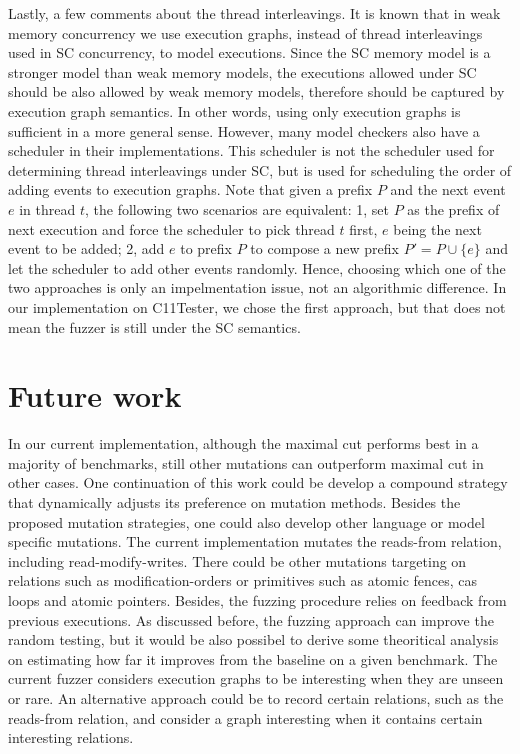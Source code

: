 Lastly, a few comments about the thread interleavings. It is known that in weak memory concurrency we use execution graphs, instead of thread interleavings used in SC concurrency, to model executions. Since the SC memory model is a stronger model than weak memory models, the executions allowed under SC should be also allowed by weak memory models, therefore should be captured by execution graph semantics. In other words, using only execution graphs is sufficient in a more general sense. However, many model checkers also have a scheduler in their implementations. This scheduler is not the scheduler used for determining thread interleavings under SC, but is used for scheduling the order of adding events to execution graphs. Note that given a prefix $P$ and the next event $e$ in thread $t$, the following two scenarios are equivalent: 1, set $P$ as the prefix of next execution and force the scheduler to pick thread $t$ first, $e$ being the next event to be added; 2, add $e$ to prefix $P$ to compose a new prefix $P' = P \cup \{e\}$ and let the scheduler to add other events randomly. Hence, choosing which one of the two approaches is only an impelmentation issue, not an algorithmic difference. In our implementation on C11Tester, we chose the first approach, but that does not mean the fuzzer is still under the SC semantics.


\section{Future work}

In our current implementation, although the maximal cut performs best in a majority of benchmarks, still other mutations can outperform maximal cut in other cases. One continuation of this work could be develop a compound strategy that dynamically adjusts its preference on mutation methods. Besides the proposed mutation strategies, one could also develop other language or model specific mutations. The current implementation mutates the reads-from relation, including read-modify-writes. There could be other mutations targeting on relations such as modification-orders or primitives such as atomic fences, cas loops and atomic pointers. Besides, the fuzzing procedure relies on feedback from previous executions. As discussed before, the fuzzing approach can improve the random testing, but it would be also possibel to derive some theoritical analysis on estimating how far it improves from the baseline on a given benchmark. The current fuzzer considers execution graphs to be interesting when they are unseen or rare. An alternative approach could be to record certain relations, such as the reads-from relation, and consider a graph interesting when it contains certain interesting relations.
